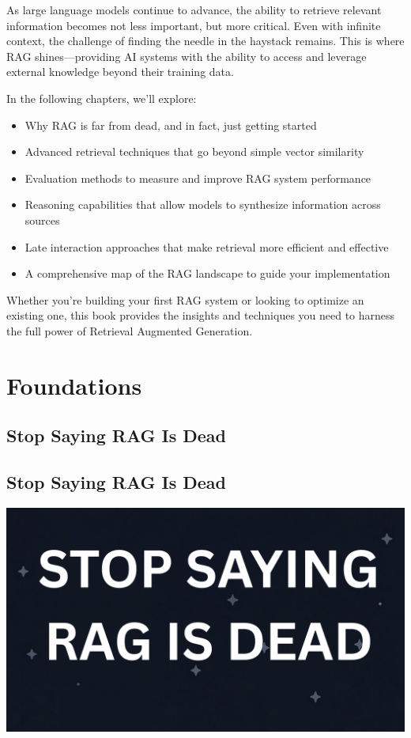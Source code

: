 \documentclass[
  letterpaper,
  oneside]{scrbook}
\providecommand{\tightlist}{%
  \setlength{\itemsep}{0pt}\setlength{\parskip}{0pt}}\usepackage{longtable,booktabs,array}
\begin{document}
As large language models continue to advance, the ability to retrieve
relevant information becomes not less important, but more critical. Even
with infinite context, the challenge of finding the needle in the
haystack remains. This is where RAG shines---providing AI systems with
the ability to access and leverage external knowledge beyond their
training data.

In the following chapters, we'll explore:

\begin{itemize}
\tightlist
\item
  Why RAG is far from dead, and in fact, just getting started
\item
  Advanced retrieval techniques that go beyond simple vector similarity
\item
  Evaluation methods to measure and improve RAG system performance
\item
  Reasoning capabilities that allow models to synthesize information
  across sources
\item
  Late interaction approaches that make retrieval more efficient and
  effective
\item
  A comprehensive map of the RAG landscape to guide your implementation
\end{itemize}

Whether you're building your first RAG system or looking to optimize an
existing one, this book provides the insights and techniques you need to
harness the full power of Retrieval Augmented Generation.

\part{Foundations}

\chapter{Stop Saying RAG Is Dead}\label{stop-saying-rag-is-dead}

\chapter{Stop Saying RAG Is Dead}\label{stop-saying-rag-is-dead-1}

\includegraphics{chapters/../rag_dead.png}
\end{document}
